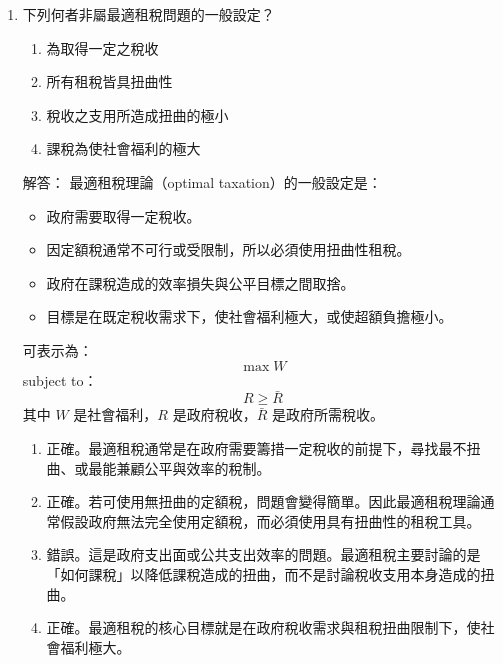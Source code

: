 \documentclass[12pt, a4paper]{article}
\begin{document}
\begin{enumerate}
    \item 下列何者非屬最適租稅問題的一般設定？
    \begin{enumerate}[label=\Alph*.]
        \item 為取得一定之稅收
        \item 所有租稅皆具扭曲性
        \item 稅收之支用所造成扭曲的極小
        \item 課稅為使社會福利的極大
    \end{enumerate}
    解答：
    最適租稅理論（optimal taxation）的一般設定是：
    \begin{itemize}
        \item 政府需要取得一定稅收。
        \item 因定額稅通常不可行或受限制，所以必須使用扭曲性租稅。
        \item 政府在課稅造成的效率損失與公平目標之間取捨。
        \item 目標是在既定稅收需求下，使社會福利極大，或使超額負擔極小。
    \end{itemize}
    可表示為：
    \[
    \max W
    \]
    subject to：
    \[
    R \geq \bar{R}
    \]
    其中 \(W\) 是社會福利，\(R\) 是政府稅收，\(\bar{R}\) 是政府所需稅收。
    \begin{enumerate}[label=\Alph*.]
        \item 正確。最適租稅通常是在政府需要籌措一定稅收的前提下，尋找最不扭曲、或最能兼顧公平與效率的稅制。
        \item 正確。若可使用無扭曲的定額稅，問題會變得簡單。因此最適租稅理論通常假設政府無法完全使用定額稅，而必須使用具有扭曲性的租稅工具。
        \item 錯誤。這是政府支出面或公共支出效率的問題。最適租稅主要討論的是「如何課稅」以降低課稅造成的扭曲，而不是討論稅收支用本身造成的扭曲。
        \item 正確。最適租稅的核心目標就是在政府稅收需求與租稅扭曲限制下，使社會福利極大。
    \end{enumerate}



\end{enumerate}
\end{document}
